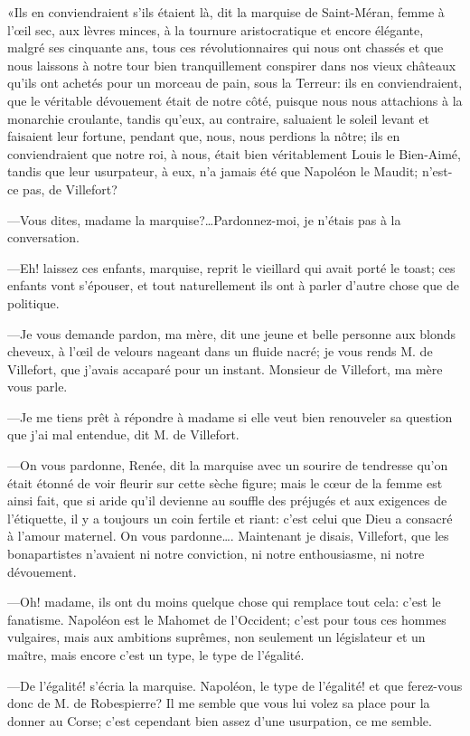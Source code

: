 «Ils en conviendraient s'ils étaient là, dit la marquise de Saint-Méran, femme à l'œil sec, aux lèvres minces, à la tournure aristocratique et encore élégante, malgré ses cinquante ans, tous ces révolutionnaires qui nous ont chassés et que nous laissons à notre tour bien tranquillement conspirer dans nos vieux châteaux qu'ils ont achetés pour un morceau de pain, sous la Terreur: ils en conviendraient, que le véritable dévouement était de notre côté, puisque nous nous attachions à la monarchie croulante, tandis qu'eux, au contraire, saluaient le soleil levant et faisaient leur fortune, pendant que, nous, nous perdions la nôtre; ils en conviendraient que notre roi, à nous, était bien véritablement Louis le Bien-Aimé, tandis que leur usurpateur, à eux, n'a jamais été que Napoléon le Maudit; n'est-ce pas, de Villefort?

—Vous dites, madame la marquise?\dots Pardonnez-moi, je n'étais pas à la conversation.

—Eh! laissez ces enfants, marquise, reprit le vieillard qui avait porté le toast; ces enfants vont s'épouser, et tout naturellement ils ont à parler d'autre chose que de politique.

—Je vous demande pardon, ma mère, dit une jeune et belle personne aux blonds cheveux, à l'œil de velours nageant dans un fluide nacré; je vous rends M. de Villefort, que j'avais accaparé pour un instant. Monsieur de Villefort, ma mère vous parle.

—Je me tiens prêt à répondre à madame si elle veut bien renouveler sa question que j'ai mal entendue, dit M. de Villefort.

—On vous pardonne, Renée, dit la marquise avec un sourire de tendresse qu'on était étonné de voir fleurir sur cette sèche figure; mais le cœur de la femme est ainsi fait, que si aride qu'il devienne au souffle des préjugés et aux exigences de l'étiquette, il y a toujours un coin fertile et riant: c'est celui que Dieu a consacré à l'amour maternel. On vous pardonne\dots. Maintenant je disais, Villefort, que les bonapartistes n'avaient ni notre conviction, ni notre enthousiasme, ni notre dévouement.

—Oh! madame, ils ont du moins quelque chose qui remplace tout cela: c'est le fanatisme. Napoléon est le Mahomet de l'Occident; c'est pour tous ces hommes vulgaires, mais aux ambitions suprêmes, non seulement un législateur et un maître, mais encore c'est un type, le type de l'égalité.

—De l'égalité! s'écria la marquise. Napoléon, le type de l'égalité! et que ferez-vous donc de M. de Robespierre? Il me semble que vous lui volez sa place pour la donner au Corse; c'est cependant bien assez d'une usurpation, ce me semble.

